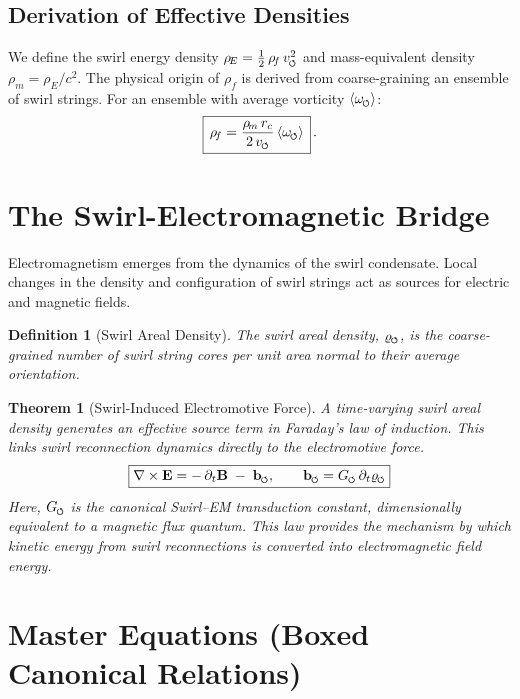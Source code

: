 \documentclass[11pt]{article}
\newcommand{\swirlarrow}{%
    \mathchoice{\mkern-2mu\scriptstyle\boldsymbol{\circlearrowleft}}%
    {\mkern-2mu\scriptstyle\boldsymbol{\circlearrowleft}}%
    {\mkern-2mu\scriptscriptstyle\boldsymbol{\circlearrowleft}}%
    {\mkern-2mu\scriptscriptstyle\boldsymbol{\circlearrowleft}}%
}
\newcommand{\vscore}{v_{\swirlarrow}}                    %
\newcommand{\rhof}{\rho_{\!f}}                           %
\newcommand{\rhoE}{\rho_{\!E}}                           %
\newcommand{\rhom}{\rho_{\!m}}                           %
\newcommand{\rc}{r_c}                                    %
\newtheorem{theorem}{Theorem}[section]
\newtheorem{definition}{Definition}[section]
\begin{document}
    \subsection{Derivation of Effective Densities}
        We define the swirl energy density $\rhoE = \tfrac{1}{2}\,\rhof\,\vscore^2$ and mass-equivalent density $\rhom = \rhoE/c^2$. The physical origin of $\rhof$ is derived from coarse-graining an ensemble of swirl strings. For an ensemble with average vorticity $\langle\omega_{\swirlarrow}\rangle$:
        \begin{equation}
        \boxed{\,\rhof = \frac{\rhom\,\rc}{2\,\vscore}\,\langle\omega_{\swirlarrow}\rangle\,}\,.
        \label{eq:rhof_from_omega}
        \end{equation}

\section{The Swirl-Electromagnetic Bridge}
    \label{sec:swirl_em_bridge}
    Electromagnetism emerges from the dynamics of the swirl condensate. Local changes in the density and configuration of swirl strings act as sources for electric and magnetic fields.

    \begin{definition}[Swirl Areal Density]
    The swirl areal density, $\varrho_{\swirlarrow}$, is the coarse-grained number of swirl string cores per unit area normal to their average orientation.
    \end{definition}

    \begin{theorem}[Swirl-Induced Electromotive Force]
    A time-varying swirl areal density generates an effective source term in Faraday's law of induction. This links swirl reconnection dynamics directly to the electromotive force.
    \[ \boxed{ \nabla \times \mathbf{E} = -\,\partial_t \mathbf{B} \;-\; \mathbf{b}_{\swirlarrow}, \qquad \mathbf{b}_{\swirlarrow} = G_{\swirlarrow}\,\partial_t \varrho_{\swirlarrow} } \]
    Here, $G_{\swirlarrow}$ is the canonical Swirl–EM transduction constant, dimensionally equivalent to a magnetic flux quantum. This law provides the mechanism by which kinetic energy from swirl reconnections is converted into electromagnetic field energy.
    \end{theorem}

\section{Master Equations (Boxed Canonical Relations)}
    \label{sec:master_equations}
\end{document}
